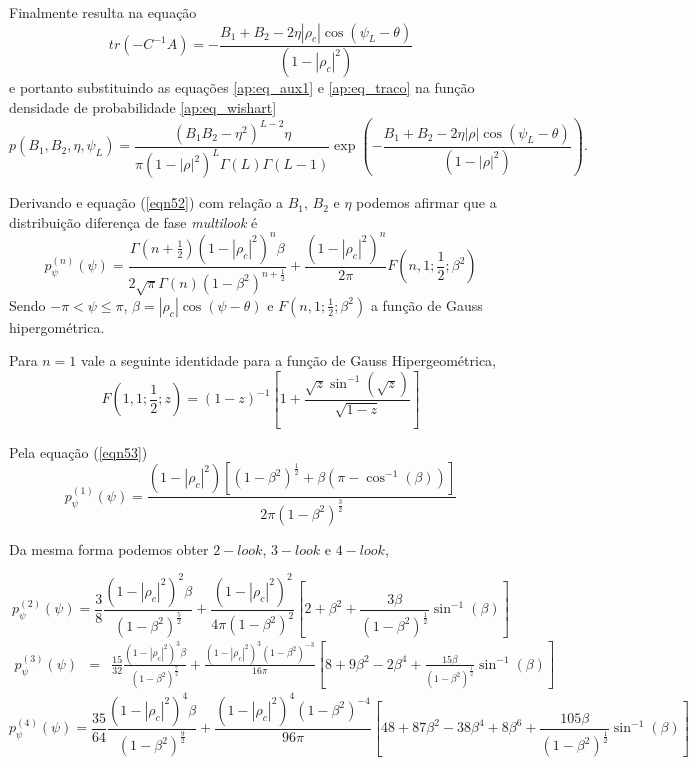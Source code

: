 Finalmente resulta na equação
\begin{equation}\label{ap:eq_traco}
	tr(-C^{-1}A)=-\frac{B_1+B_2-2\eta |\rho_c|\cos(\psi_L-\theta)}{(1-|\rho_c|^2)}
\end{equation}
e portanto substituindo as equações \eqref{ap:eq_aux1} e \eqref{ap:eq_traco} na função densidade de probabilidade \eqref{ap:eq_wishart}   
\begin{equation}\label{ap:eq_pdf_aux}
	p(B_1,B_2,\eta,\psi_L)=\frac{\left(B_1B_2-\eta^2\right)^{L-2}\eta}{\pi(1-|\rho|^2)^{L}\Gamma(L)\Gamma(L-1)}\exp\left(-\frac{B_1+B_2-2\eta |\rho|\cos(\psi_L-\theta)}{(1-|\rho|^2)}\right).
\end{equation}

Derivando e equação (\ref{eqn52}) com relação a $B_1$, $B_2$ e $\eta$ podemos afirmar que a distribuição diferença de fase {\it multilook} é 
\begin{equation}\label{eqn53}
	p_{\psi}^{(n)}(\psi)=\frac{\Gamma(n+\frac{1}{2})(1-|\rho_c|^2)^n\beta}{2\sqrt{\pi}\Gamma(n)(1-\beta^2)^{n+\frac{1}{2}}}+\frac{(1-|\rho_c|^2)^n}{2\pi}F(n,1;\frac{1}{2};\beta^2)
\end{equation}
Sendo $-\pi<\psi\leq\pi$, $\beta=|\rho_c|\cos(\psi-\theta)$ e $F(n,1;\frac{1}{2};\beta^2)$ a função de Gauss hipergométrica.

Para $n=1$  vale a seguinte identidade para a função de Gauss Hipergeométrica,
\begin{equation}\label{eqn54}
	F(1,1;\frac{1}{2};z)=(1-z)^{-1}\left[1+\frac{\sqrt{z}\sin^{-1}(\sqrt{z})}{\sqrt{1-z}}\right]
\end{equation}

Pela equação (\ref{eqn53})
\begin{equation}\label{eqn55}
	p_{\psi}^{(1)}(\psi)=\frac{(1-|\rho_c|^2)[(1-\beta^{2})^{\frac{1}{2}}+\beta(\pi-\cos^{-1}(\beta))]}{2\pi(1-\beta^{2})^{\frac{3}{2}}}
\end{equation}

Da mesma forma podemos obter $2-look$, $3-look$ e $4-look$,

\begin{equation}\label{eqn56}
	p_{\psi}^{(2)}(\psi)=\frac{3}{8}\frac{(1-|\rho_c|^2)^2\beta}{(1-\beta^2)^{\frac{5}{2}}}+\frac{(1-|\rho_c|^2)^2}{4\pi(1-\beta^2)^{2}}\left[2+\beta^2+\frac{3\beta}{(1-\beta^2)^{\frac{1}{2}}}\sin^{-1}(\beta)\right]
\end{equation}
\begin{equation}\label{eqn57}
\begin{array}{ccc}
	p_{\psi}^{(3)}(\psi)&=&\frac{15}{32}\frac{(1-|\rho_c|^2)^3\beta}{(1-\beta^2)^{\frac{7}{2}}}+\frac{(1-|\rho_c|^2)^3(1-\beta^2)^{-3}}{16\pi}\left[8+9\beta^2-2\beta^4+\frac{15\beta}{(1-\beta^2)^{\frac{1}{2}}}\sin^{-1}(\beta)\right]
\end{array}
\end{equation}
\begin{equation}\label{eqn58}
	p_{\psi}^{(4)}(\psi)=\frac{35}{64}\frac{(1-|\rho_c|^2)^4\beta}{(1-\beta^2)^{\frac{9}{2}}}+\frac{(1-|\rho_c|^2)^4(1-\beta^2)^{-4}}{96\pi}\left[48+87\beta^2-38\beta^4+8\beta^6+\frac{105\beta}{(1-\beta^2)^{\frac{1}{2}}}\sin^{-1}(\beta)\right]
\end{equation}

